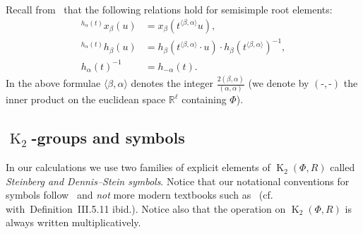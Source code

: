 \documentclass[10pt,a4paper,twoside]{article}
\theoremstyle{remark}
\theoremstyle{definition}
\numberwithin{lemma}{section}
\numberwithin{prop}{section}
\numberwithin{corollary}{section}
\numberwithin{externaltheorem}{section}
\DeclareMathOperator{\K}{K}
\numberwithin{equation}{section}
\begin{document}
Recall from~\cite[Lemma~5.2]{Ma69} that the following relations hold for semisimple root elements:
\begin{align} \label{eq:conj-h-x} {}^{h_\alpha(t)}\!x_\beta(u) & = x_\beta(t^{\langle \beta,  \alpha \rangle}u), \\
              \label{eq:conj-h-h} {}^{h_\alpha(t)}\!h_\beta(u) & = h_\beta(t^{\langle \beta, \alpha \rangle} \cdot u) \cdot h_\beta(t^{\langle \beta,  \alpha \rangle})^{-1}, \\
              \label{eq:h-inv}    h_\alpha(t)^{-1}             & = h_{-\alpha}(t). \end{align}
In the above formulae $\langle \beta, \alpha \rangle$ denotes the integer $\tfrac{2(\beta, \alpha)}{(\alpha, \alpha)}$ (we denote by $(\text{-},\text{-})$ the inner product on the euclidean space $\mathbb{R}^\ell$ containing $\Phi$).

\subsection{\texorpdfstring{$\K_2$}{K2}-groups and symbols} In our calculations we use two families of explicit elements of $\K_2(\Phi, R)$ called {\it Steinberg and Dennis--Stein symbols}. Notice that our notational conventions for symbols follow~\cite{DS73} and {\it not} more modern textbooks such as~\cite{Kbook} (cf. with~Definition~III.5.11 ibid.). Notice also that the operation on $\K_2(\Phi, R)$ is always written multiplicatively.
\end{document}
